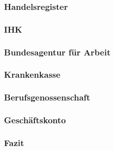 \subsubsection{Handelsregister} \label{handelsregister}

\subsubsection{IHK} \label{ihk}

\subsubsection{Bundesagentur für Arbeit} \label{bundesagenturFuerArbeit}

\subsubsection{Krankenkasse} \label{krankenkasse}

\subsubsection{Berufsgenossenschaft} \label{berufsgenossenschaft}

\subsubsection{Geschäftskonto} \label{geschaeftskonto}

\subsubsection{Fazit} \label{fazitDigitaleBehoerden}

